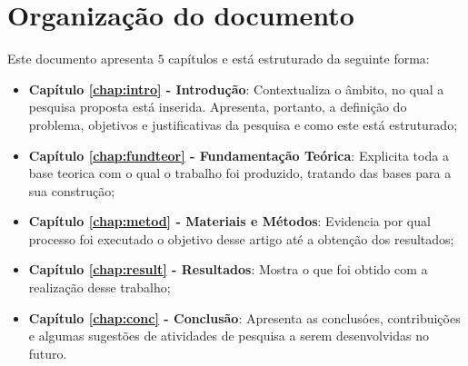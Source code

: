 \section{Organização do documento}
\label{section:organizacao}

Este documento apresenta $5$ capítulos e está estruturado da seguinte forma:

\begin{itemize}

  \item \textbf{Capítulo \ref{chap:intro} - Introdução}: Contextualiza o âmbito, no qual a pesquisa proposta está inserida. Apresenta, portanto, a definição do problema, objetivos e justificativas da pesquisa e como este \thetypeworkthree está estruturado;
  \item \textbf{Capítulo \ref{chap:fundteor} - Fundamentação Teórica}: Explicita toda a base teorica com o qual o trabalho foi produzido, tratando das bases para a sua construção;
  \item \textbf{Capítulo \ref{chap:metod} - Materiais e Métodos}: Evidencia por qual processo foi executado o objetivo desse artigo até a obtenção dos resultados;
  \item \textbf{Capítulo \ref{chap:result} - Resultados}: Mostra o que foi obtido com a realização desse trabalho;
  \item \textbf{Capítulo \ref{chap:conc} - Conclusão}: Apresenta as conclusóes, contribuições e algumas sugestões de atividades de pesquisa a serem desenvolvidas no futuro.

\end{itemize}
